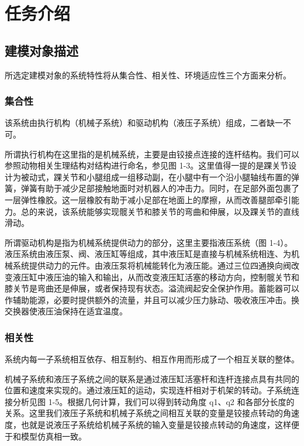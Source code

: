 \newpage

\section{任务介绍}

\subsection{建模对象描述}

所选定建模对象的系统特性将从集合性、相关性、环境适应性三个方面来分析。

\subsubsection{集合性}

该系统由执行机构（机械子系统）和驱动机构（液压子系统）组成，二者缺一不可。
 
所谓执行机构在这里指的是机械系统，主要是由铰接点连接的连杆结构。我们可以参照动物相关生理结构对结构进行命名，参见图 1-3。这里值得一提的是踝关节设计为被动式，踝关节和小腿组成一组移动副，在小腿中有一个沿小腿轴线布置的弹簧，弹簧有助于减少足部接触地面时对机器人的冲击力。同时，在足部外面包裹了一层弹性橡胶。这一层橡胶有助于减小足部在地面上的摩擦，从而改善腿部牵引能力。总的来说，该系统能够实现髋关节和膝关节的弯曲和伸展，以及踝关节的直线滑动。 

所谓驱动机构是指为机械系统提供动力的部分，这里主要指液压系统（图 1-4）。液压系统由液压泵、阀、液压缸等组成，其中液压缸是直接与机械系统相连、为机械系统提供动力的元件。由液压泵将机械能转化为液压能。通过三位四通换向阀改变液压缸中液压油的输入和输出，从而改变液压缸活塞的移动方向，控制髋关节和膝关节是弯曲还是伸展，或者保持现有状态。溢流阀起安全保护作用。蓄能器可以作辅助能源，必要时提供额外的流量，并且可以减少压力脉动、吸收液压冲击。换交换器使液压油保持在适宜温度。

\subsubsection{相关性}

系统内每一子系统相互依存、相互制约、相互作用而形成了一个相互关联的整体。

机械子系统和液压子系统之间的联系是通过液压缸活塞杆和连杆连接点具有共同的位置和速度来实现的。通过液压缸的运动，实现连杆相对于机架的转动。子系统连接分析见图 1-5。根据几何计算，我们可以得到转动角度 q1、q2 和各部分长度的关系。这里我们液压子系统和机械子系统之间相互关联的变量是铰接点转动的角速度，也就是说液压子系统给机械子系统的输入变量是铰接点转动的角速度，这样便于和模型仿真相一致。 

